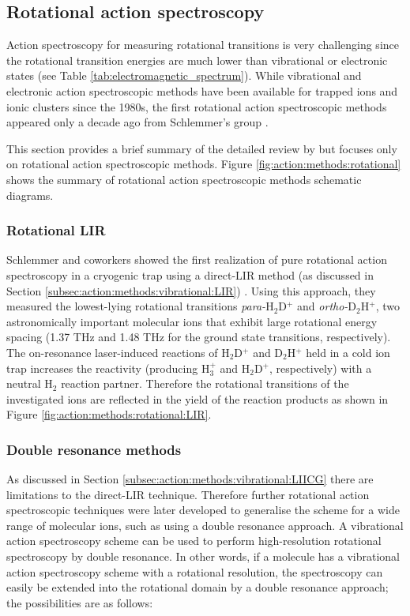 \subsection{Rotational action spectroscopy}
\label{subsec:action:methods:rotational}

Action spectroscopy for measuring rotational transitions is very challenging
since the rotational transition energies are much lower than vibrational or
electronic states (see Table \ref{tab:electromagnetic_spectrum}). While
vibrational and electronic action spectroscopic methods have been available for
trapped ions and ionic clusters since the 1980s, the first rotational action
spectroscopic methods appeared only a decade ago from Schlemmer's group
\cite{Asvany2008}.

This section provides a brief summary of the detailed review by
\citet{Asvany2021} but focuses only on rotational action spectroscopic methods.
Figure \ref{fig:action:methods:rotational} shows the summary of rotational
action spectroscopic methods schematic diagrams.

\subsubsection{Rotational LIR}
\label{subsec:rotational-LIR}

Schlemmer and coworkers showed the first realization of pure rotational action
spectroscopy in a cryogenic trap using a direct-LIR method (as discussed in
Section \ref{subsec:action:methods:vibrational:LIR}) \cite{Asvany2008}. Using
this approach, they measured the lowest-lying rotational transitions
\emph{para-}H$_2$D$^+$ and \emph{ortho-}D$_2$H$^+$, two astronomically
important molecular ions that exhibit large rotational energy spacing (1.37 THz
and 1.48 THz for the ground state transitions, respectively). The on-resonance
laser-induced reactions of H$_2$D$^+$ and D$_2$H$^+$ held in a cold ion trap
increases the reactivity (producing H$_3^+$ and H$_2$D$^+$, respectively) with
a neutral H$_2$ reaction partner. Therefore the rotational transitions of the
investigated ions are reflected in the yield of the reaction products as shown
in Figure \ref{fig:action:methods:rotational:LIR}.

\subsubsection{Double resonance methods}
\label{subsec:action:methods:rotational:DR}

As discussed in Section \ref{subsec:action:methods:vibrational:LIICG} there are
limitations to the direct-LIR technique. Therefore further rotational action
spectroscopic techniques were later developed to generalise the scheme for a
wide range of molecular ions, such as using a double resonance approach. A
vibrational action spectroscopy scheme can be used to perform high-resolution
rotational spectroscopy by double resonance. In other words, if a molecule has
a vibrational action spectroscopy scheme with a rotational resolution, the
spectroscopy can easily be extended into the rotational domain by a double
resonance approach; the possibilities are as follows:

